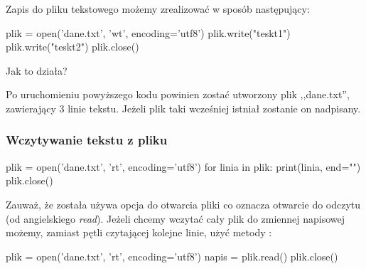 \documentclass{pdfBooklets}
\begin{document}
Zapis do pliku tekstowego możemy zrealizować w sposób następujący:
\begin{CodeFrame*}[python]{}
plik = open('dane.txt', 'wt', encoding='utf8')
plik.write("teskt1\n")
plik.write("teskt2")
plik.close()
\end{CodeFrame*}

\noindent Jak to działa?

Po uruchomieniu powyższego kodu powinien zostać utworzony plik ,,dane.txt'', zawierający 3 linie tekstu. Jeżeli plik taki wcześniej istniał zostanie on nadpisany.

\subsubsection{Wczytywanie tekstu z pliku}

\begin{CodeFrame*}[python]{}
plik = open('dane.txt', 'rt', encoding='utf8')
for linia in plik:
  print(linia, end="")
plik.close()
\end{CodeFrame*}

Zauważ, że została używa opcja  do otwarcia pliki co oznacza otwarcie do odczytu (od angielskiego \textit{read}). Jeżeli chcemy wczytać cały plik do zmiennej napisowej możemy, zamiast pętli czytającej kolejne linie, użyć metody :
\begin{CodeFrame*}[python]{}
plik = open('dane.txt', 'rt', encoding='utf8')
napis = plik.read()
plik.close()
\end{CodeFrame*}
\end{document}
